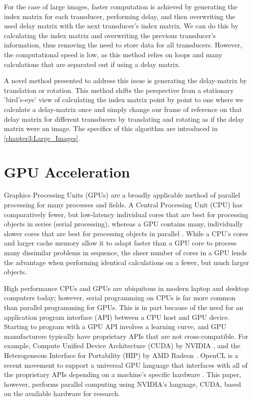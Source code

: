     For the case of large images, faster computation is achieved by generating the index matrix for each transducer, performing delay, and then overwriting the used delay matrix with the next transducer's index matrix. We can do this by calculating the index matrix and overwriting the previous transducer's information, thus removing the need to store data for all transducers. However, the computational speed is low, as this method relies on loops and many calculations that are separated out if using a delay matrix.

    A novel method presented to address this issue is generating the delay-matrix by translation or rotation. This method shifts the perspective from a stationary 'bird's-eye' view of calculating the index matrix point by point to one where we calculate a delay-matrix once and simply change our frame of reference on that delay matrix for different transducers by translating and rotating as if the delay matrix were an image. The specifics of this algorithm are introduced in \ref{chapter3:Large_Images}.

\section{GPU Acceleration}
\label{chapter2:gpu_accel}

    Graphics Processing Units (GPUs) are a broadly applicable method of parallel processing for many processes and fields. A Central Processing Unit (CPU) has comparatively fewer, but low-latency individual cores that are best for processing objects in series (serial processing), whereas a GPU contains many, individually slower cores that are best for processing objects in parallel \cite{caulfieldCPUVsGPU2009}. While a CPU's cores and larger cache memory allow it to adapt faster than a GPU core to process many dissimilar problems in sequence, the sheer number of cores in a GPU lends the advantage when performing identical calculations on a fewer, but much larger objects.

    High performance CPUs and GPUs are ubiquitous in modern laptop and desktop computers today; however, serial programming on CPUs is far more common than parallel programming for GPUs. This is in part because of the need for an application program interface (API) between a CPU host and GPU device. Starting to program with a GPU API involves a learning curve, and GPU manufacturers typically have proprietary APIs that are not cross-compatible. For example, Compute Unified Device Architecture (CUDA) by NVIDIA \cite{CUDAZoneLibrary2017}, and the Heterogeneous Interface for Portability (HIP) by AMD Radeon \cite{IntroductionHIPFAQ}. OpenCL is a recent movement to support a universal GPU language that interfaces with all of the proprietary APIs depending on a machine's specific hardware \cite{OpenCLOpenStandard2013}. This paper, however, performs parallel computing using NVIDIA's language, CUDA, based on the available hardware for research.


